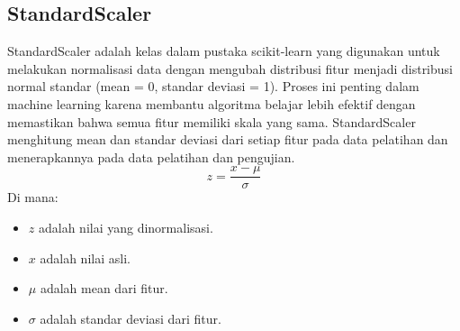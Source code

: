 \subsection{StandardScaler}
StandardScaler adalah kelas dalam pustaka scikit-learn yang digunakan untuk melakukan normalisasi data dengan mengubah distribusi fitur menjadi distribusi normal standar (mean = 0, standar deviasi = 1). Proses ini penting dalam machine learning karena membantu algoritma belajar lebih efektif dengan memastikan bahwa semua fitur memiliki skala yang sama. StandardScaler menghitung mean dan standar deviasi dari setiap fitur pada data pelatihan dan menerapkannya pada data pelatihan dan pengujian.
\begin{equation}
    z = \frac{x - \mu}{\sigma}
\end{equation}
Di mana:
\begin{itemize}
    \item $z$ adalah nilai yang dinormalisasi.
    \item $x$ adalah nilai asli.
    \item $\mu$ adalah mean dari fitur.
    \item $\sigma$ adalah standar deviasi dari fitur.
\end{itemize}

